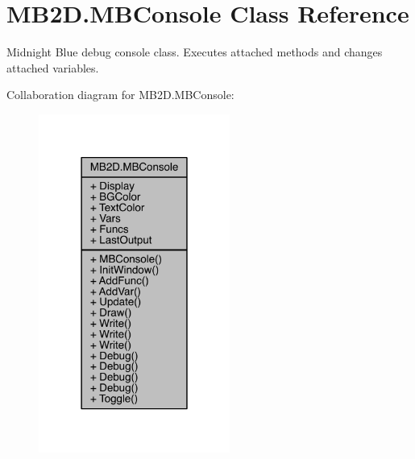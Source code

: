 \hypertarget{class_m_b2_d_1_1_m_b_console}{}\section{M\+B2\+D.\+M\+B\+Console Class Reference}
\label{class_m_b2_d_1_1_m_b_console}


Midnight Blue debug console class. Executes attached methods and changes attached variables.  




Collaboration diagram for M\+B2\+D.\+M\+B\+Console\+:\nopagebreak
\begin{figure}[H]
\begin{center}
\leavevmode
\includegraphics[width=178pt]{class_m_b2_d_1_1_m_b_console__coll__graph}
\end{center}
\end{figure}
